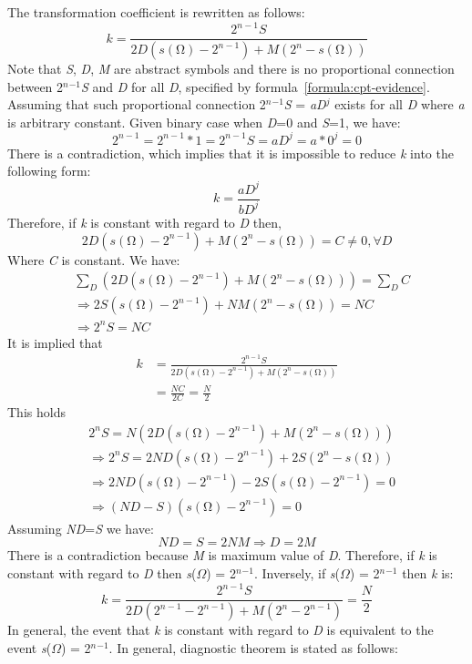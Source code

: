 \documentclass{article}
\numberwithin{equation}{section}
\numberwithin{figure}{section}
\numberwithin{table}{section}
\begin{document}
\noindent The transformation coefficient is rewritten as follows:
\[k=\frac{2^{n-1}S}{2D\left(s\left(\mathrm{\Omega }\right)-2^{n-1}\right)+M\left(2^n-s\left(\mathrm{\Omega }\right)\right)}\] 
Note that \textit{S}, \textit{D}, \textit{M} are abstract symbols and there is no proportional connection between 2\textit{${}^{n}$}${}^{-1}$\textit{S} and \textit{D} for all \textit{D}, specified by formula~\ref{formula:cpt-evidence}. Assuming that such proportional connection 2\textit{${}^{n}$}${}^{-1}$\textit{S} = \textit{aD${}^{j}$} exists for all \textit{D} where \textit{a} is arbitrary constant. Given binary case when \textit{D}=0 and \textit{S}=1, we have:
\[2^{n-1}=2^{n-1}*1=2^{n-1}S=aD^j=a*0^j=0\] 
There is a contradiction, which implies that it is impossible to reduce \textit{k} into the following form:
\[k=\frac{aD^j}{bD^j}\]
Therefore, if \textit{k} is constant with regard to \textit{D} then,
\[2D\left(s\left(\mathrm{\Omega }\right)-2^{n-1}\right)+M\left(2^n-s\left(\mathrm{\Omega }\right)\right)=C\neq 0,\forall D\] 
Where \textit{C} is constant. We have:
\begin{align*}
&\sum_D{\left(2D\left(s\left(\mathrm{\Omega }\right)-2^{n-1}\right)+M\left(2^n-s\left(\mathrm{\Omega }\right)\right)\right)}=\sum_D{C}\\
&\Rightarrow 2S\left(s\left(\mathrm{\Omega }\right)-2^{n-1}\right)+NM\left(2^n-s\left(\mathrm{\Omega }\right)\right)=NC\\
&\Rightarrow 2^nS=NC
\end{align*}
It is implied that
\begin{align*}
k&=\frac{2^{n-1}S}{2D\left(s\left(\mathrm{\Omega }\right)-2^{n-1}\right)+M\left(2^n-s\left(\mathrm{\Omega }\right)\right)}\\
&=\frac{NC}{2C}=\frac{N}{2}
\end{align*}
This holds
\begin{align*}
&2^nS=N\left(2D\left(s\left(\mathrm{\Omega }\right)-2^{n-1}\right)+M\left(2^n-s\left(\mathrm{\Omega }\right)\right)\right)\\
&\Rightarrow 2^nS=2ND\left(s\left(\mathrm{\Omega }\right)-2^{n-1}\right)+2S\left(2^n-s\left(\mathrm{\Omega }\right)\right)\\
&\Rightarrow 2ND\left(s\left(\mathrm{\Omega }\right)-2^{n-1}\right)-2S\left(s\left(\mathrm{\Omega }\right)-2^{n-1}\right)=0\\
&\Rightarrow \left(ND-S\right)\left(s\left(\mathrm{\Omega }\right)-2^{n-1}\right)=0
\end{align*}
Assuming \textit{ND}=\textit{S} we have:
\[ND=S=2NM\Rightarrow D=2M\] 
There is a contradiction because \textit{M} is maximum value of \textit{D}. Therefore, if \textit{k} is constant with regard to \textit{D} then \textit{s}($\Omega$) = 2\textit{${}^{n}$}${}^{-1}$. Inversely, if \textit{s}($\Omega$) = 2\textit{${}^{n}$}${}^{-1}$ then \textit{k} is:
\[k=\frac{2^{n-1}S}{2D\left(2^{n-1}-2^{n-1}\right)+M\left(2^n-2^{n-1}\right)}=\frac{N}{2}\] 
In general, the event that \textit{k} is constant with regard to \textit{D} is equivalent to the event \textit{s}($\Omega$) = 2\textit{${}^{n}$}${}^{-1}$. In general, diagnostic theorem is stated as follows:
\end{document}
